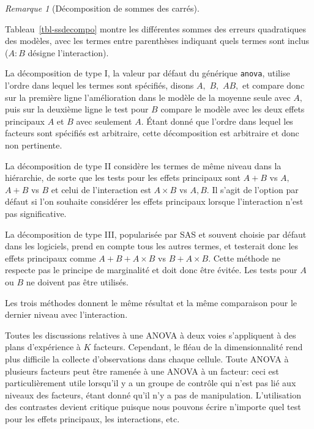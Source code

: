 \documentclass[
  11pt,
  letterpaper,
]{scrbook}
\theoremstyle{plain}
\theoremstyle{plain}
\theoremstyle{definition}
\theoremstyle{definition}
\theoremstyle{remark}
\newtheorem{refremark}{Remarque}[chapter]
\begin{document}
\begin{refremark}[Décomposition de sommes des carrés]
\begin{longtable}[]
\end{longtable}

Tableau~\ref{tbl-ssdecompo} montre les différentes sommes des erreurs
quadratiques des modèles, avec les termes entre parenthèses indiquant
quels termes sont inclus (\(A:B\) désigne l'interaction).

La décomposition de type I, la valeur par défaut du générique
\texttt{anova}, utilise l'ordre dans lequel les termes sont spécifiés,
disons \(A,\) \(B,\) \(AB,\) et compare donc sur la première ligne
l'amélioration dans le modèle de la moyenne seule avec \(A,\) puis sur
la deuxième ligne le test pour \(B\) compare le modèle avec les deux
effets principaux \(A\) et \(B\) avec seulement \(A.\) Étant donné que
l'ordre dans lequel les facteurs sont spécifiés est arbitraire, cette
décomposition est arbitraire et donc non pertinente.

La décomposition de type II considère les termes de même niveau dans la
hiérarchie, de sorte que les tests pour les effets principaux sont
\(A + B\) vs \(A,\) \(A+B\) vs \(B\) et celui de l'interaction est
\(A\times B\) vs \(A, B.\) Il s'agit de l'option par défaut si l'on
souhaite considérer les effets principaux lorsque l'interaction n'est
pas significative.

La décomposition de type III, popularisée par SAS et souvent choisie par
défaut dans les logiciels, prend en compte tous les autres termes, et
testerait donc les effets principaux comme \(A + B + A\times B\) vs
\(B + A\times B.\) Cette méthode ne respecte pas le principe de
marginalité et doit donc être évitée. Les tests pour \(A\) ou \(B\) ne
doivent pas être utilisés.

Les trois méthodes donnent le même résultat et la même comparaison pour
le dernier niveau avec l'interaction.

\label{rem-sumofsquare}

\end{refremark}

Toutes les discussions relatives à une ANOVA à deux voies s'appliquent à
des plans d'expérience à \(K\) facteurs. Cependant, le fléau de la
dimensionnalité rend plus difficile la collecte d'observations dans
chaque cellule. Toute ANOVA à plusieurs facteurs peut être ramenée à une
ANOVA à un facteur: ceci est particulièrement utile lorsqu'il y a un
groupe de contrôle qui n'est pas lié aux niveaux des facteurs, étant
donné qu'il n'y a pas de manipulation. L'utilisation des contrastes
devient critique puisque nous pouvons écrire n'importe quel test pour
les effets principaux, les interactions, etc.
\end{document}
